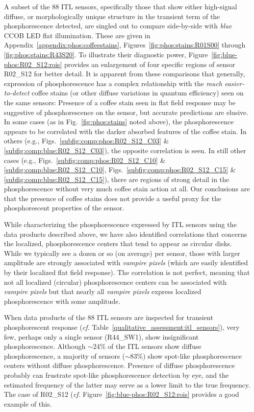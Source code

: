 A subset of the 88 ITL sensors, specifically those that show either high-signal diffuse, or morphologically unique structure in the transient term of the phosphorescence detected, are singled out to compare side-by-side with {\it blue} CCOB LED flat illumination. These are given in Appendix~\ref{appendix:phos:coffeestains}, Figures~\ref{fig:phos:stains:R01S00} through \ref{fig:phos:stains:R43S20}. To illustrate their diagnostic power, Figure~\ref{fig:blue-phos:R02_S12:rois} provides an enlargement of four specific regions of sensor R02\_S12 for better detail. It is apparent from these comparisons that generally, expression of phosphorescence has a complex relationship with the {\it much easier-to-detect} coffee stains (or other diffuse variations in quantum efficiency) seen on the same sensors: Presence of a coffee stain seen in flat field response may be suggestive of phosphorescence on the sensor, but accurate predictions are elusive.  In some cases (as in Fig.~\ref{fig:phos:stains} noted above), the phosphorescence appears to be correlated with the darker absorbed features of the coffee stain. In others (e.g., Figs.~\ref{subfig:comp:phos:R02_S12_C03} \& \ref{subfig:comp:blue:R02_S12_C03}), the opposite correlation is seen. In still other cases (e.g., Figs.~\ref{subfig:comp:phos:R02_S12_C10} \& \ref{subfig:comp:blue:R02_S12_C10}, Figs.~\ref{subfig:comp:phos:R02_S12_C15} \& \ref{subfig:comp:blue:R02_S12_C15}), there are regions of strong detail in the phosphorescence without very much coffee stain action at all. Our conclusions are that the presence of coffee stains does not provide a useful proxy for the phosphorescent properties of the sensor.




While characterizing the phosphorescence expressed by ITL sensors using the data products described above, we have also identified correlations that concerns the localized, phosphorescence centers that tend to appear as circular disks. While we typically see a dozen or so (on average) per sensor, those with larger amplitude are strongly associated with {\it vampire pixels} (which are easily identified by their localized flat field response). The correlation is not perfect, meaning that not all localized (circular) phosphorescence centers can be associated with {\it vampire pixels} but that nearly all {\it vampire pixels} express localized phosphorescence with some amplitude. 

When data products of the 88 ITL sensors are inspected for transient phosphorescent response ({\it cf.} Table~\ref{qualitative_assessment:itl_sensors}), very few, perhaps only a single sensor (R44\_SW1), show insignificant phosphorescence. Although $\sim$24\% of the ITL sensors show diffuse phosphorescence, a majority of sensors ($\sim$83\%) show spot-like phosphorescence centers without diffuse phosphorescence. Presence of diffuse phosphorescence probably can frustrate spot-like phosphorescence detection by eye, and the estimated frequency of the latter may serve as a lower limit to the true frequency. The case of R02\_S12 ({\it cf.} Figure~\ref{fig:blue-phos:R02_S12:rois} provides a good example of this.

